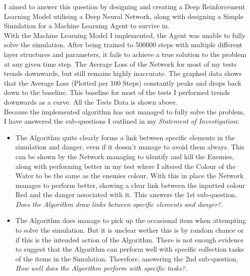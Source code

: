 \begin{flushleft}
        I aimed to answer this question by designing and creating a Deep Reinforcement Learning Model utilising a Deep Neural Network, along 
        with designing a Simple Simulation for a Machine Learning Agent to survive in. \\
        \vspace{0.2cm}
        With the Machine Learning Model I implemented, the Agent was unable to fully solve the simulation. After being trained to 500000
        steps with multiple different layer structures and parameters, it fails to achieve a true solution to the problem at any given time step.
        The Average Loss of the Network for most of my tests trends downwards, but still remains highly inaccurate. The graphed data shows
        that the Average Loss (Plotted per 100 Steps) constantly peaks and drops back down to the baseline. This baseline for most of the tests
        I performed trends downwards as a curve. All the Tests Data is shown above. \\
        \vspace{0.2cm}
        Because the implemented algorithm has not managed to fully solve the problem, I have answered the sub-questions I outlined in my 
        \textit{Statement of Investigation}: \\

        \begin{itemize}
            \item The Algorithm quite clearly forms a link between specific elements in the simulation and danger, even if it doesn't manage to avoid them
            always. This can be shown by the Network managing to identify and kill the Enemies, along with performing better in my test where I altered 
            the Colour of the Water to be the same as the enemies colour. With this in place the Network manages to perform better, showing a clear
            link between the inputted colour Red and the danger associated with it. This answers the 1st sub-question, \textit{Does the Algorithm draw 
            links between specific elements and danger?}. \\
            \vspace{0.2cm}

            \item The Algorithm does manage to pick up the occasional item when attempting to solve the simulation. But it is unclear wether this is by random
            chance or if this is the intended action of the Algorithm. There is not enough evidence to suggest that the Algorithm can perform well with
            specific collection tasks of the items in the Simulation. Therefore, answering the 2nd sub-question, \textit{How well does the Algorithm perform 
            with specific tasks?}. \\
            \vspace{0.2cm}


\end{itemize}
\end{flushleft}
